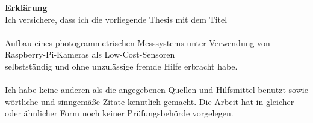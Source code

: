 \documentclass[a4paper,12pt,bibliography=totoc, listof=totoc, titlepage]{scrreprt}
\begin{document}
\tableofcontents
\newpage

\setcounter{page}{1}

















\clearpage

\printglossaries

\clearpage
\renewcommand\UrlFont\itshape
\renewcommand{\refname}{Literaturverzeichnis}

\listoffigures
\listoftables


\renewcommand{\appendixpagename}{\appendixname}
\renewcommand{\appendixtocname}{\appendixname}
\begin{appendices}
    
    
    
    
\end{appendices}

\clearpage
\thispagestyle{empty}
\noindent\textbf{\large Erklärung}\\
Ich versichere, dass ich die vorliegende Thesis mit dem Titel\\
\\
Aufbau eines photogrammetrischen Messsystems unter Verwendung von Raspberry-Pi-Kameras als Low-Cost-Sensoren
\\
selbstständig und ohne unzulässige fremde Hilfe erbracht habe.\\
\\
Ich habe keine anderen als die angegebenen Quellen und Hilfsmittel benutzt sowie wörtliche und
sinngemäße Zitate kenntlich gemacht. Die Arbeit hat in gleicher oder ähnlicher Form
noch keiner Prüfungsbehörde vorgelegen.
\\
\\
\\
\\
\end{document}
